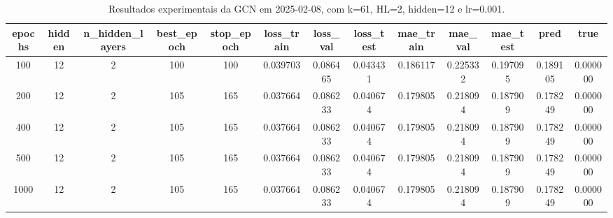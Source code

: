 \begin{table}[h]
\centering
\caption{Resultados experimentais da GCN em 2025-02-08, com k=61, HL=2, hidden=12 e lr=0.001.}
\label{tab:gcn_results_k61_hl2_h12_d20250208}
\begin{tabular}{ccccccccccccc}
\toprule
epochs & hidden & n\_hidden\_layers & best\_epoch & stop\_epoch & loss\_train & loss\_val & loss\_test & mae\_train & mae\_val & mae\_test & pred & true \\
\midrule
100 & 12 & 2 & 100 & 100 & 0.039703 & 0.086465 & 0.043431 & 0.186117 & 0.225332 & 0.197095 & 0.189105 & 0.000000 \\
200 & 12 & 2 & 105 & 165 & 0.037664 & 0.086233 & 0.040674 & 0.179805 & 0.218094 & 0.187909 & 0.178249 & 0.000000 \\
400 & 12 & 2 & 105 & 165 & 0.037664 & 0.086233 & 0.040674 & 0.179805 & 0.218094 & 0.187909 & 0.178249 & 0.000000 \\
500 & 12 & 2 & 105 & 165 & 0.037664 & 0.086233 & 0.040674 & 0.179805 & 0.218094 & 0.187909 & 0.178249 & 0.000000 \\
1000 & 12 & 2 & 105 & 165 & 0.037664 & 0.086233 & 0.040674 & 0.179805 & 0.218094 & 0.187909 & 0.178249 & 0.000000 \\
\bottomrule
\end{tabular}
\end{table}
